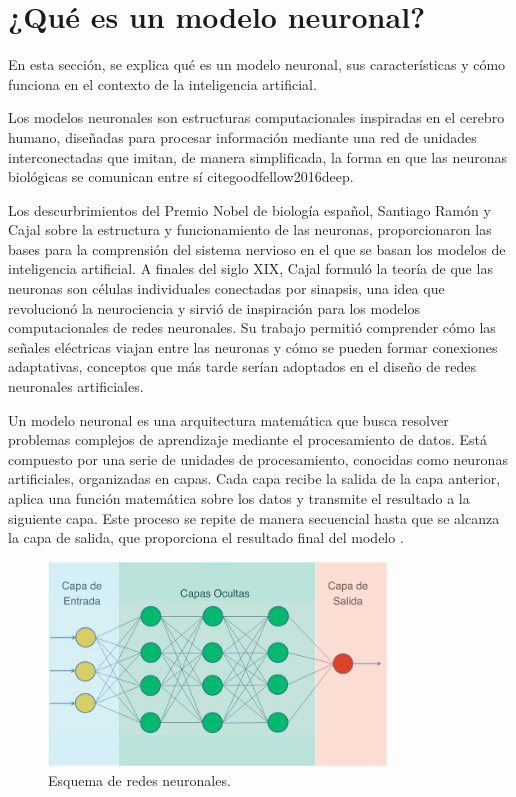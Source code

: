 
\section{¿Qué es un modelo neuronal?}

En esta sección, se explica qué es un modelo neuronal, sus características y cómo funciona en el contexto de la inteligencia artificial. 

Los modelos neuronales son estructuras computacionales inspiradas en el cerebro humano, diseñadas para procesar información mediante una red de unidades interconectadas que imitan, de manera simplificada, la forma en que las neuronas biológicas se comunican entre sí cite{goodfellow2016deep}.

Los descurbrimientos del Premio Nobel de biología español, Santiago Ramón y Cajal sobre la estructura y funcionamiento de las neuronas, proporcionaron las bases para la comprensión del sistema nervioso en el que se basan los modelos de inteligencia artificial. A finales del siglo XIX, Cajal formuló la teoría de que las neuronas son células individuales conectadas por sinapsis, una idea que revolucionó la neurociencia y sirvió de inspiración para los modelos computacionales de redes neuronales. Su trabajo permitió comprender cómo las señales eléctricas viajan entre las neuronas y cómo se pueden formar conexiones adaptativas, conceptos que más tarde serían adoptados en el diseño de redes neuronales artificiales.

Un modelo neuronal es una arquitectura matemática que busca resolver problemas complejos de aprendizaje mediante el procesamiento de datos. Está compuesto por una serie de unidades de procesamiento, conocidas como neuronas artificiales, organizadas en capas. Cada capa recibe la salida de la capa anterior, aplica una función matemática sobre los datos y transmite el resultado a la siguiente capa. Este proceso se repite de manera secuencial hasta que se alcanza la capa de salida, que proporciona el resultado final del modelo \cite{bishop2006pattern}.

\begin{figure}[H]
    \centering
    \includegraphics[width=0.8\textwidth]{./img/modelo/capas.png}
    \caption{Esquema de redes neuronales. \cite{aprendeia2021deep}}
    \label{fig:esq-capas}
\end{figure}

